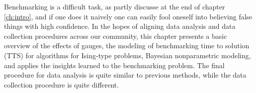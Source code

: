 %



% 


%
%
%
%

Benchmarking is a difficult task, as partly discusse at the end of chapter \ref{ch:intro}, and if one does it naively one can easily fool oneself into believing false things with high confidence. In the hopes of aligning data analysis and data collection procedures across our community, this chapter presents a basic overview of the effects of gauges, the modeling of benchmarking time to solution (TTS) for algorithms for Ising-type problems, Bayesian nonparametric modeling, and applies the insights learned to the benchmarking problem. The final procedure for data analysis is quite similar to previous methods, while the data collection procedure is quite different.

